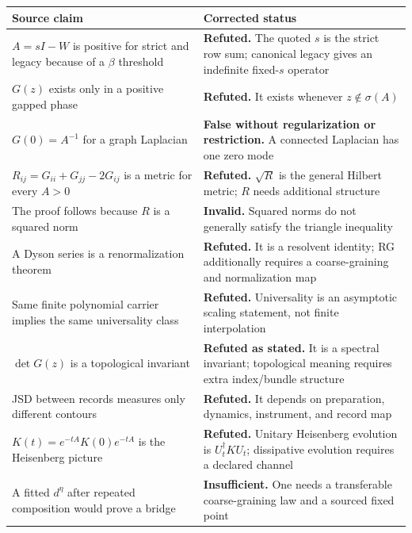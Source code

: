 \documentclass[11pt,a4paper,openany]{report}
\begin{document}
\begin{center}
\begingroup\small
\setlength{\tabcolsep}{3.5pt}
\renewcommand{\arraystretch}{1.16}
\begin{longtable}{@{}p{}p{}@{}}
\toprule
\textbf{Source claim} & \textbf{Corrected status} \\
\midrule
\endhead
\(A=sI-W\) is positive for strict and legacy because of a \(\beta\) threshold & \textbf{Refuted.} The quoted \(s\) is the strict row sum; canonical legacy gives an indefinite fixed-\(s\) operator \\
\(G(z)\) exists only in a positive gapped phase & \textbf{Refuted.} It exists whenever \(z\notin\sigma(A)\) \\
\(G(0)=A^{-1}\) for a graph Laplacian & \textbf{False without regularization or restriction.} A connected Laplacian has one zero mode \\
\(R_{ij}=G_{ii}+G_{jj}-2G_{ij}\) is a metric for every \(A>0\) & \textbf{Refuted.} \(\sqrt R\) is the general Hilbert metric; \(R\) needs additional structure \\
The proof follows because \(R\) is a squared norm & \textbf{Invalid.} Squared norms do not generally satisfy the triangle inequality \\
A Dyson series is a renormalization theorem & \textbf{Refuted.} It is a resolvent identity; RG additionally requires a coarse-graining and normalization map \\
Same finite polynomial carrier implies the same universality class & \textbf{Refuted.} Universality is an asymptotic scaling statement, not finite interpolation \\
\(\det G(z)\) is a topological invariant & \textbf{Refuted as stated.} It is a spectral invariant; topological meaning requires extra index/\allowbreak{}bundle structure \\
JSD between records measures only different contours & \textbf{Refuted.} It depends on preparation, dynamics, instrument, and record map \\
\(K(t)=e^{-tA}K(0)e^{-tA}\) is the Heisenberg picture & \textbf{Refuted.} Unitary Heisenberg evolution is \(U_t^\dagger K U_t\); dissipative evolution requires a declared channel \\
A fitted \(d^\eta\) after repeated composition would prove a bridge & \textbf{Insufficient.} One needs a transferable coarse-graining law and a sourced fixed point \\
\bottomrule
\end{longtable}
\endgroup
\end{center}
\end{document}
